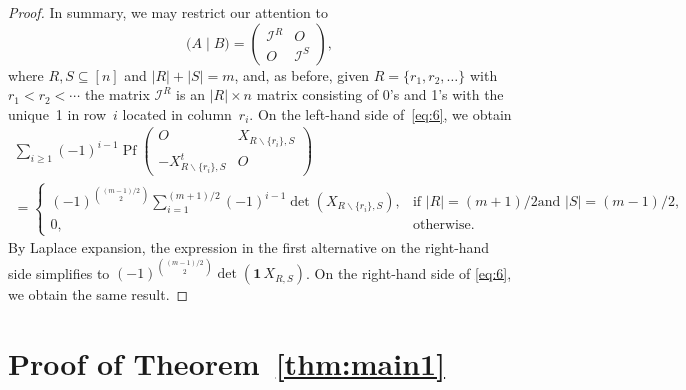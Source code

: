 \documentclass[12pt,reqno]{amsart}
\numberwithin{equation}{section}
\theoremstyle{definition}
\theoremstyle{remark}
\def\Pf{\operatorname{Pf}}
\begin{document}
\begin{proof}
In summary, we may restrict our attention to
$$
\bigl(A\mid B\bigr)=\begin{pmatrix}
\mathcal I^R&O\\
O&\mathcal I^S\end{pmatrix},
$$
where $R,S\subseteq[n]$ and $|R|+|S|=m$, and, as before,
given $R=\{r_1,r_2,\dots\}$ with $r_1<r_2<\cdots$ the matrix $\mathcal
I^R$ is
an $|R|\times n$ matrix consisting of 0's and 1's with the unique~1 in row~$i$
located in column~$r_i$. On the left-hand side of~\eqref{eq:6}, we obtain
\begin{multline*}
\sum_{i\ge1}(-1)^{i-1}
\Pf\begin{pmatrix} O&X_{R\backslash\{r_i\},S}\\
-X_{R\backslash\{r_i\},S}^t&O\end{pmatrix}\\
=\begin{cases}
\displaystyle(-1)^{\binom {(m-1)/2}2}\sum_{i=1}^{(m+1)/2}(-1)^{i-1}
\det(X_{R\backslash\{r_i\},S}),&\text{if $|R|=(m+1)/2$
and $|S|=(m-1)/2$},\\
0,&\text{otherwise.}
\end{cases}
\end{multline*}
By Laplace expansion, the expression in the first alternative on the
right-hand side simplifies to $(-1)^{\binom {(m-1)/2}2}
\det(\mathbf1\,X_{R,S})$.
On the right-hand side of \eqref{eq:6}, we obtain the same result.
\end{proof}


\section{Proof of Theorem~\ref{thm:main1}}
\label{sec:main}
\end{document}
